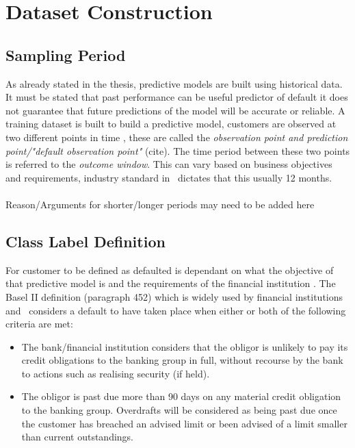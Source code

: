 \begin{comment}
rule applied to Census towns.  1 SAPS – Small Area Population Statistics  For census reports, urban settlements are towns with a population of 1,500 or more, while settlements with a population  of less than 1,500 are classified as rural.
\end{comment}



\section{Dataset Construction}

\subsection{Sampling Period}
As already stated in the thesis, predictive models are built using historical data. It must be stated that past performance can be useful predictor of default it does not guarantee that future predictions of the model will be accurate or reliable. A training dataset is built to build a predictive model, customers are observed at two different points in time \citep{martens_credit_2010}, these are called the \textit{observation point and prediction point/"default observation point"} (cite). The time period between these two points is referred to the \textit{outcome window}. This can vary based on business objectives and requirements, industry standard in \subjectname\ dictates that this usually 12 months. \\\\

Reason/Arguments for shorter/longer periods may need to be added here \\

\subsection{Class Label Definition} \label{classLabelDef}
For customer to be defined as defaulted is dependant on what the objective of that predictive model is and the requirements of the financial institution \citep{mcnab_principles_2000}. The Basel II definition (paragraph 452) which is widely used by financial institutions and \subjectname\ considers a default to have taken place when either or both of the following criteria are met:
\vspace{-3mm} 
\begin{itemize}
	\item The bank/financial institution considers that the obligor is unlikely to pay its credit obligations to the banking group in full, without recourse by the bank to actions such as realising security (if held).
	\item The obligor is past due more than 90 days on any material credit obligation to the banking group. Overdrafts will be considered as being past due once the customer has breached an advised limit or been advised of a limit smaller than current outstandings.
\end{itemize} 

